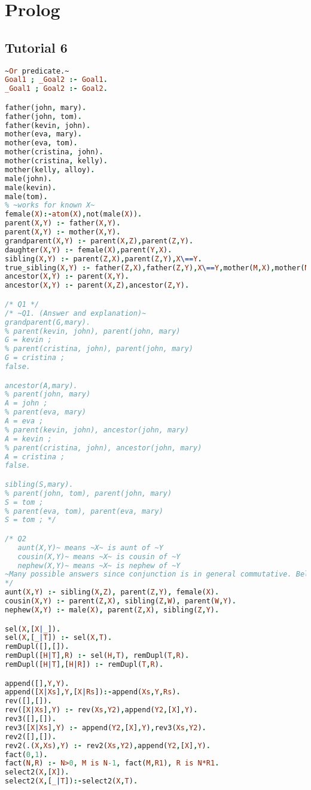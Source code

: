 \documentclass[fontsize=10pt]{slnotes}
\begin{document}
\clearpage\chapter{Prolog}
\section{Tutorial 6}
\begin{lstlisting}[escapechar=\~,escapebegin=\rmfamily,language=Prolog]
~Or predicate.~
Goal1 ; _Goal2 :- Goal1.
_Goal1 ; Goal2 :- Goal2.

father(john, mary).
father(john, tom).
father(kevin, john).
mother(eva, mary).
mother(eva, tom).
mother(cristina, john).
mother(cristina, kelly).
mother(kelly, alloy).
male(john).
male(kevin).
male(tom).
% ~works for known X~
female(X):-atom(X),not(male(X)).
parent(X,Y) :- father(X,Y).
parent(X,Y) :- mother(X,Y).
grandparent(X,Y) :- parent(X,Z),parent(Z,Y).
daughter(X,Y) :- female(X),parent(Y,X).
sibling(X,Y) :- parent(Z,X),parent(Z,Y),X\==Y.
true_sibling(X,Y) :- father(Z,X),father(Z,Y),X\==Y,mother(M,X),mother(M,Y).
ancestor(X,Y) :- parent(X,Y).
ancestor(X,Y) :- parent(X,Z),ancestor(Z,Y).

/* Q1 */
/* ~Q1. (Answer and explanation)~
grandparent(G,mary).
% parent(kevin, john), parent(john, mary)
G = kevin ;
% parent(cristina, john), parent(john, mary)
G = cristina ;
false.

ancestor(A,mary).
% parent(john, mary)
A = john ;
% parent(eva, mary)
A = eva ;
% parent(kevin, john), ancestor(john, mary)
A = kevin ;
% parent(cristina, john), ancestor(john, mary)
A = cristina ;
false.

sibling(S,mary).
% parent(john, tom), parent(john, mary)
S = tom ;
% parent(eva, tom), parent(eva, mary)
S = tom ; */

/* Q2
   aunt(X,Y)~ means ~X~ is aunt of ~Y
   cousin(X,Y)~ means ~X~ is cousin of ~Y
   nephew(X,Y)~ means ~X~ is nephew of ~Y
~Many possible answers since conjunction is in general commutative. Below is one of the possible answers.~
*/
aunt(X,Y) :- sibling(X,Z), parent(Z,Y), female(X).
cousin(X,Y) :- parent(Z,X), sibling(Z,W), parent(W,Y).
nephew(X,Y) :- male(X), parent(Z,X), sibling(Z,Y).

sel(X,[X|_]).
sel(X,[_|T]) :- sel(X,T).
remDupl([],[]).
remDupl([H|T],R) :- sel(H,T), remDupl(T,R).
remDupl([H|T],[H|R]) :- remDupl(T,R).

append([],Y,Y).
append([X|Xs],Y,[X|Rs]):-append(Xs,Y,Rs).
rev([],[]).
rev([X|Xs],Y) :- rev(Xs,Y2),append(Y2,[X],Y).
rev3([],[]).
rev3([X|Xs],Y) :- append(Y2,[X],Y),rev3(Xs,Y2).
rev2([],[]).
rev2(.(X,Xs),Y) :- rev2(Xs,Y2),append(Y2,[X],Y).
fact(0,1).
fact(N,R) :- N>0, M is N-1, fact(M,R1), R is N*R1.
select2(X,[X]).
select2(X,[_|T]):-select2(X,T).


\end{lstlisting}
\end{document}

